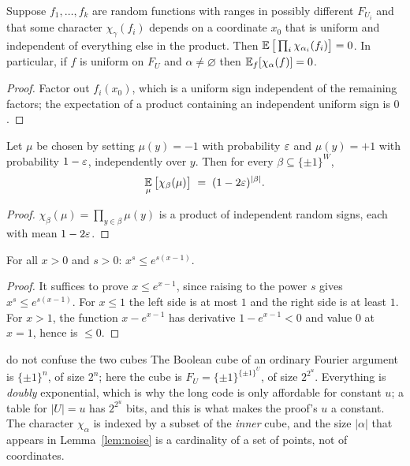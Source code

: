 \begin{lemma}\label{lem:indep-f}
Suppose $f_1,\dots,f_k$ are random functions with ranges in possibly different $F_{U_i}$ and that some character $\chi_\gamma(f_i)$ depends on a coordinate $x_0$ that is uniform and independent of everything else in the product.  Then
$\operatorname*{\mathbb{E}}\big[\prod_i\chi_{\alpha_i}(f_i)\big]=0$.
In particular, if $f$ is uniform on $F_U$ and $\alpha\ne\varnothing$ then $\operatorname*{\mathbb{E}}_f[\chi_\alpha(f)]=0$.
\end{lemma}
\begin{proof}
Factor out $f_i(x_0)$, which is a uniform sign independent of the remaining factors; the expectation of a product containing an independent uniform sign is $0$.
\end{proof}

\begin{lemma}\label{lem:noise}
Let $\mu$ be chosen by setting $\mu(y)=-1$ with probability $\varepsilon$ and $\mu(y)=+1$ with probability $1-\varepsilon$, independently over $y$.  Then for every $\beta\subseteq\{\pm1\}^W$,
\[
  \operatorname*{\mathbb{E}}_\mu\big[\chi_\beta(\mu)\big]\;=\;(1-2\varepsilon)^{|\beta|}.
\]
\end{lemma}
\begin{proof}
$\chi_\beta(\mu)=\prod_{y\in\beta}\mu(y)$ is a product of independent random signs, each with mean $1-2\varepsilon$.
\end{proof}

\begin{lemma}\label{lem:exp}
For all $x>0$ and $s>0$: $x^s\le e^{s(x-1)}$.
\end{lemma}
\begin{proof}
It suffices to prove $x\le e^{x-1}$, since raising to the power $s$ gives $x^s\le e^{s(x-1)}$.  For $x\le1$ the left side is at most $1$ and the right side is at least $1$.  For $x>1$, the function $x-e^{x-1}$ has derivative $1-e^{x-1}<0$ and value $0$ at $x=1$, hence is $\le0$.
\end{proof}

\begin{pitfall}{do not confuse the two cubes}
The Boolean cube of an ordinary Fourier argument is $\{\pm1\}^n$, of size $2^n$; here the cube is $F_U=\{\pm1\}^{\{\pm1\}^U}$, of size $2^{2^u}$.  Everything is \emph{doubly} exponential, which is why the long code is only affordable for constant $u$; a table for $|U|=u$ has $2^{2^u}$ bits, and this is what makes the proof's $u$ a constant.
The character $\chi_\alpha$ is indexed by a subset of the \emph{inner} cube, and the size $|\alpha|$ that appears in Lemma~\ref{lem:noise} is a cardinality of a set of points, not of coordinates.
\end{pitfall}


